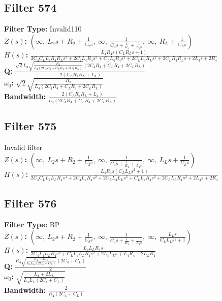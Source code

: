 \documentclass{article}
\begin{document}
\subsection*{Filter 574}
\textbf{Filter Type:} Invalid110 \\ 
\textbf{$Z(s)$:} $\left( \infty, \  L_{2} s + R_{2} + \frac{1}{C_{2} s}, \  \infty, \  \frac{1}{C_{4} s + \frac{1}{R_{4}} + \frac{1}{L_{4} s}}, \  \infty, \  R_{L} + \frac{1}{C_{L} s}\right)$ \\ 
\textbf{$H(s)$:} $\frac{L_{4} R_{4} s \left(C_{L} R_{L} s + 1\right)}{2 C_{4} C_{L} L_{4} R_{4} R_{L} s^{3} + 2 C_{4} L_{4} R_{4} s^{2} + C_{L} L_{4} R_{4} s^{2} + 2 C_{L} L_{4} R_{L} s^{2} + 2 C_{L} R_{4} R_{L} s + 2 L_{4} s + 2 R_{4}}$ \\ 
\textbf{Q:} $\frac{\sqrt{2} L_{4} \sqrt{\frac{R_{4}}{L_{4} \left(2 C_{4} R_{4} + C_{L} R_{4} + 2 C_{L} R_{L}\right)}} \left(2 C_{4} R_{4} + C_{L} R_{4} + 2 C_{L} R_{L}\right)}{2 \left(C_{L} R_{4} R_{L} + L_{4}\right)}$ \\ 
\textbf{$\omega_0$:} $\sqrt{2} \sqrt{\frac{R_{4}}{L_{4} \left(2 C_{4} R_{4} + C_{L} R_{4} + 2 C_{L} R_{L}\right)}}$ \\ 
\textbf{Bandwidth:} $\frac{2 \left(C_{L} R_{4} R_{L} + L_{4}\right)}{L_{4} \left(2 C_{4} R_{4} + C_{L} R_{4} + 2 C_{L} R_{L}\right)}$ \\ 
\subsection*{Filter 575}
Invalid filter \\ 
\textbf{$Z(s)$:} $\left( \infty, \  L_{2} s + R_{2} + \frac{1}{C_{2} s}, \  \infty, \  \frac{1}{C_{4} s + \frac{1}{R_{4}} + \frac{1}{L_{4} s}}, \  \infty, \  L_{L} s + \frac{1}{C_{L} s}\right)$ \\ 
\textbf{$H(s)$:} $\frac{L_{4} R_{4} s \left(C_{L} L_{L} s^{2} + 1\right)}{2 C_{4} C_{L} L_{4} L_{L} R_{4} s^{4} + 2 C_{4} L_{4} R_{4} s^{2} + 2 C_{L} L_{4} L_{L} s^{3} + C_{L} L_{4} R_{4} s^{2} + 2 C_{L} L_{L} R_{4} s^{2} + 2 L_{4} s + 2 R_{4}}$ \\ 
\subsection*{Filter 576}
\textbf{Filter Type:} BP \\ 
\textbf{$Z(s)$:} $\left( \infty, \  L_{2} s + R_{2} + \frac{1}{C_{2} s}, \  \infty, \  \frac{1}{C_{4} s + \frac{1}{R_{4}} + \frac{1}{L_{4} s}}, \  \infty, \  \frac{L_{L} s}{C_{L} L_{L} s^{2} + 1}\right)$ \\ 
\textbf{$H(s)$:} $\frac{L_{4} L_{L} R_{4} s}{2 C_{4} L_{4} L_{L} R_{4} s^{2} + C_{L} L_{4} L_{L} R_{4} s^{2} + 2 L_{4} L_{L} s + L_{4} R_{4} + 2 L_{L} R_{4}}$ \\ 
\textbf{Q:} $\frac{R_{4} \sqrt{\frac{L_{4} + 2 L_{L}}{L_{4} L_{L} \left(2 C_{4} + C_{L}\right)}} \left(2 C_{4} + C_{L}\right)}{2}$ \\ 
\textbf{$\omega_0$:} $\sqrt{\frac{L_{4} + 2 L_{L}}{L_{4} L_{L} \left(2 C_{4} + C_{L}\right)}}$ \\ 
\textbf{Bandwidth:} $\frac{2}{R_{4} \left(2 C_{4} + C_{L}\right)}$ \\ 
\end{document}
